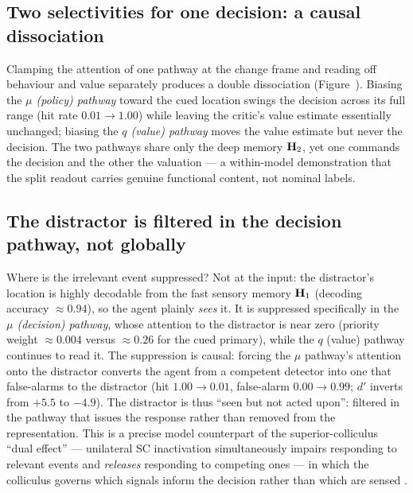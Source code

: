 \subsection{Two selectivities for one decision: a causal dissociation}
Clamping the attention of one pathway at the change frame and reading off behaviour
and value separately produces a double dissociation
(Figure~). Biasing the \emph{$\mu$ (policy) pathway} toward the
cued location swings the decision across its full range (hit rate $0.01 \to 1.00$)
while leaving the critic's value estimate essentially unchanged; biasing the \emph{$q$
(value) pathway} moves the value estimate but never the decision. The two pathways
share only the deep memory $\mathbf{H}_2$, yet one commands the decision and the other the
valuation --- a within-model demonstration that the split readout carries genuine
functional content, not nominal labels.

\subsection{The distractor is filtered in the decision pathway, not globally}
Where is the irrelevant event suppressed? Not at the input: the distractor's location
is highly decodable from the fast sensory memory $\mathbf{H}_1$ (decoding accuracy
$\approx 0.94$), so the agent plainly \emph{sees} it. It is suppressed specifically in
the \emph{$\mu$ (decision) pathway}, whose attention to the distractor is near zero
(priority weight $\approx 0.004$ versus $\approx 0.26$ for the cued primary), while the
$q$ (value) pathway continues to read it. The suppression is causal: forcing the $\mu$
pathway's attention onto the distractor converts the agent from a competent detector
into one that false-alarms to the distractor (hit $1.00 \to 0.01$, false-alarm
$0.00 \to 0.99$; $d'$ inverts from $+5.5$ to $-4.9$). The distractor is thus
``seen but not acted upon'': filtered in the pathway that issues the response rather
than removed from the representation. This is a precise model counterpart of the
superior-colliculus ``dual effect'' --- unilateral SC inactivation simultaneously
impairs responding to relevant events and \emph{releases} responding to competing
ones --- in which the colliculus governs which signals inform the decision rather than
which are sensed \citep{lovejoy2010inactivation, zenon2012attention, herman2020attention}.

